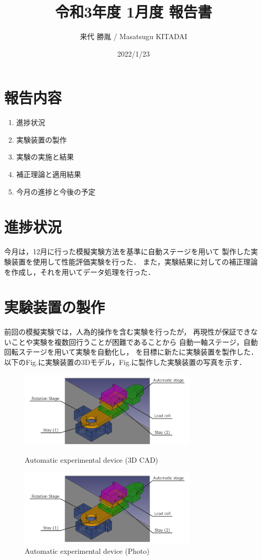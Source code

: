 \documentclass[twocolumn,a4j]{jsarticle}
\author{来代 勝胤 / Masatsugu KITADAI}
\title{令和3年度 1月度 報告書}
\date{2022/1/23}
\begin{document}
\columnseprule=0.1mm

\maketitle
\section*{報告内容}
\begin{enumerate}[1.]
    \item 進捗状況
    \item 実験装置の製作
    \item 実験の実施と結果
    \item 補正理論と適用結果
    \item 今月の進捗と今後の予定
\end{enumerate}

\section{進捗状況}
今月は，12月に行った模擬実験方法を基準に自動ステージを用いて
製作した実験装置を使用して性能評価実験を行った．
また，実験結果に対しての補正理論を作成し，それを用いてデータ処理を行った．

\section{実験装置の製作}

前回の模擬実験では，人為的操作を含む実験を行ったが，
再現性が保証できないことや実験を複数回行うことが困難であることから
自動一軸ステージ，自動回転ステージを用いて実験を自動化し，
を目標に新たに実験装置を製作した．
以下のFig.に実験装置の3Dモデル，Fig.に製作した実験装置の写真を示す．

\begin{figure}[htbp]
    \footnotesize
    \begin{center}
        \includegraphics[width=85mm]{../images/21-1.png}
        \caption{Automatic experimental device (3D CAD)}
        \includegraphics[width=85mm]{../images/21-1.png}
        \caption{Automatic experimental device (Photo)}
    \end{center}
\end{figure}
\end{document}
